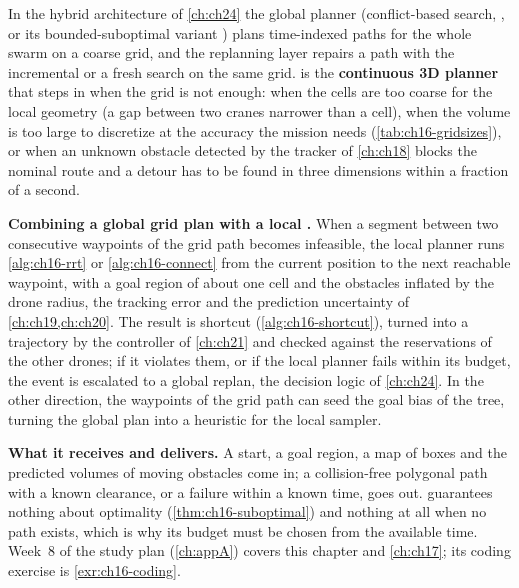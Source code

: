 \begin{dronebox}
In the hybrid architecture of \cref{ch:ch24} the global planner
(conflict-based search, \cbs, or its bounded-suboptimal variant \ecbs) plans
time-indexed paths for the whole swarm on a coarse grid, and the replanning
layer repairs a path with the incremental \dstarlite or a fresh \astar search
on the same grid. \rrt is the \textbf{continuous 3D planner} that steps in when the grid
is not enough: when the cells are too coarse for the local geometry (a gap
between two cranes narrower than a cell), when the volume is too large to
discretize at the accuracy the mission needs (\cref{tab:ch16-gridsizes}),
or when an unknown obstacle detected by the tracker of \cref{ch:ch18}
blocks the nominal route and a detour has to be found in three dimensions
within a fraction of a second.

\textbf{Combining a global grid plan with a local \rrt.} When a segment
between two consecutive waypoints of the grid path becomes infeasible, the
local planner runs \cref{alg:ch16-rrt} or \cref{alg:ch16-connect} from the
current position to the next reachable waypoint, with a goal region of
about one cell and the obstacles inflated by the drone radius, the tracking
error and the prediction uncertainty of \cref{ch:ch19,ch:ch20}. The result
is shortcut (\cref{alg:ch16-shortcut}), turned into a trajectory by the
controller of \cref{ch:ch21} and checked against the reservations of the
other drones; if it violates them, or if the local planner fails within its
budget, the event is escalated to a global replan, the decision logic of
\cref{ch:ch24}. In the other direction, the waypoints of the grid path can
seed the goal bias of the tree, turning the global plan into a heuristic for
the local sampler.

\textbf{What it receives and delivers.} A start, a goal region, a map of
boxes and the predicted volumes of moving obstacles come in; a
collision-free polygonal path with a known clearance, or a failure within a
known time, goes out. \rrt guarantees nothing about optimality
(\cref{thm:ch16-suboptimal}) and nothing at all when no path exists, which
is why its budget must be chosen from the available time. Week~8 of the
study plan (\cref{ch:appA}) covers this chapter and \cref{ch:ch17}; its
coding exercise is \cref{exr:ch16-coding}.
\end{dronebox}

